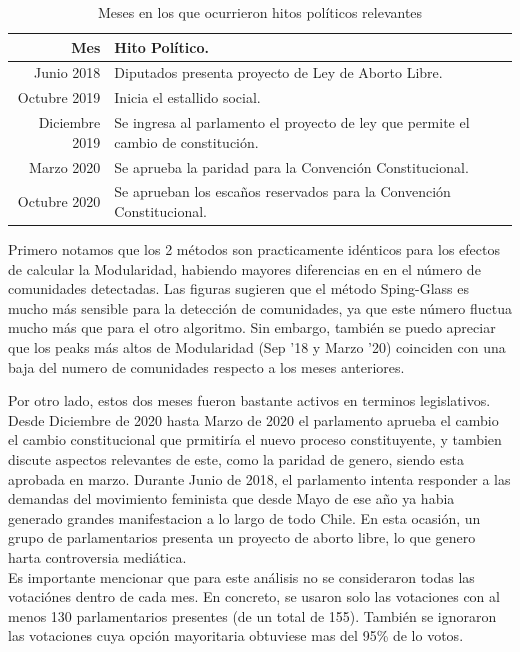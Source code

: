 \documentclass{proyectotesis}
\begin{document}
\begin{table}[ht!]
    \centering
    \caption{Meses en los que ocurrieron hitos políticos relevantes}
    \label{hp} 
    \begin{tabular}{r|l}
    Mes & Hito Político.\\
    \hline
    Junio 2018 & Diputados presenta proyecto de Ley de Aborto Libre.\\
    Octubre 2019 & Inicia el estallido social.\\
    Diciembre 2019 & Se ingresa al parlamento el proyecto de ley que permite el cambio de constitución.\\
    Marzo 2020 & Se aprueba la paridad para la Convención Constitucional.\\
    Octubre 2020 & Se aprueban los escaños reservados para la Convención Constitucional.
    \end{tabular}
\end{table}


Primero notamos que los 2 métodos son practicamente idénticos para los efectos de calcular la Modularidad, habiendo mayores diferencias en en el número de comunidades detectadas. Las figuras sugieren que el método Sping-Glass es mucho más sensible para la detección de comunidades, ya que este número fluctua mucho más que para el otro algoritmo. Sin embargo, también se puedo apreciar que los peaks más altos de Modularidad (Sep ’18 y Marzo ’20) coinciden con una baja del numero de comunidades respecto a los meses anteriores.

Por otro lado, estos dos meses fueron bastante activos en terminos legislativos. Desde Diciembre de 2020 hasta Marzo de 2020 el parlamento aprueba el cambio el cambio constitucional que prmitiría el nuevo proceso constituyente, y tambien
discute aspectos relevantes de este, como la paridad de genero, siendo esta aprobada en marzo. Durante Junio de 2018, el parlamento intenta responder a las demandas del movimiento feminista que desde Mayo de ese año ya habia generado grandes manifestacion a lo largo de todo Chile. En esta ocasión, un grupo de parlamentarios presenta un proyecto de aborto libre, lo que genero harta controversia mediática.\\

Es importante mencionar que para este análisis no se consideraron todas las votaciónes dentro de cada mes. En concreto, se usaron solo las votaciones con al menos 130 parlamentarios presentes (de un total de 155). También se ignoraron las votaciones cuya opción mayoritaria obtuviese mas del 95\% de lo votos. 
\end{document}
